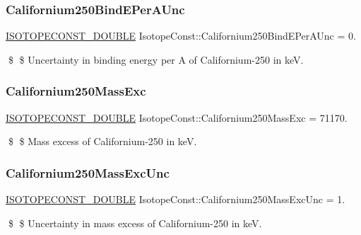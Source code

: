 \subsubsection{\texorpdfstring{Californium250\+Bind\+E\+Per\+A\+Unc}{Californium250BindEPerAUnc}}
{\footnotesize\ttfamily \mbox{\hyperlink{group___isotope_const-_macros_ga8f45a7272ce02c0b4c65c44636ed719a}{I\+S\+O\+T\+O\+P\+E\+C\+O\+N\+S\+T\+\_\+\+D\+O\+U\+B\+LE}} Isotope\+Const\+::\+Californium250\+Bind\+E\+Per\+A\+Unc = 0.}

\$ \$ Uncertainty in binding energy per A of Californium-\/250 in keV. \mbox{\label{group___isotope_const-_californium-_cf250_ga1d3d298bf1ad417e25bcb77891bf006a}} 
\subsubsection{\texorpdfstring{Californium250\+Mass\+Exc}{Californium250MassExc}}
{\footnotesize\ttfamily \mbox{\hyperlink{group___isotope_const-_macros_ga8f45a7272ce02c0b4c65c44636ed719a}{I\+S\+O\+T\+O\+P\+E\+C\+O\+N\+S\+T\+\_\+\+D\+O\+U\+B\+LE}} Isotope\+Const\+::\+Californium250\+Mass\+Exc = 71170.}

\$ \$ Mass excess of Californium-\/250 in keV. \mbox{\label{group___isotope_const-_californium-_cf250_gab1f53f79a94634099cf80f530105e89b}} 
\subsubsection{\texorpdfstring{Californium250\+Mass\+Exc\+Unc}{Californium250MassExcUnc}}
{\footnotesize\ttfamily \mbox{\hyperlink{group___isotope_const-_macros_ga8f45a7272ce02c0b4c65c44636ed719a}{I\+S\+O\+T\+O\+P\+E\+C\+O\+N\+S\+T\+\_\+\+D\+O\+U\+B\+LE}} Isotope\+Const\+::\+Californium250\+Mass\+Exc\+Unc = 1.}

\$ \$ Uncertainty in mass excess of Californium-\/250 in keV. \mbox{\label{group___isotope_const-_californium-_cf250_gabc92a4ce7a40c5d59bb44cf34b661f41}} 
